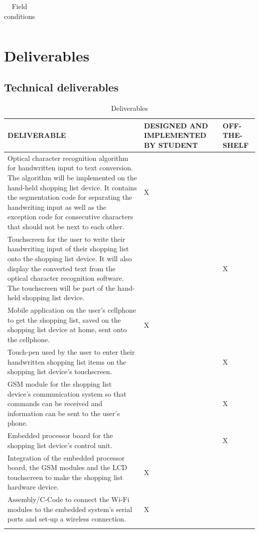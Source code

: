 {\begin{center}
\begin{longtable}{|p{7.5cm}|p{7.5cm}|}
		\caption{Field conditions}
	\end{longtable}
\end{center}
\newpage

\section{Deliverables}

\subsection{Technical deliverables}

\begin{center}
	\begin{longtable}{|p{7cm}|p{3.5cm}|p{3.5cm}|}
		\hline
		\textbf{DELIVERABLE} & \textbf{DESIGNED AND IMPLEMENTED BY STUDENT} &
		\textbf{OFF-THE-SHELF} \\
		\hline
		Optical character recognition algorithm for handwritten input to text conversion. The algorithm will be implemented on the hand-held shopping list device.  It contains the segmentation code for separating the handwriting input as well as the exception code for consecutive characters that should not be next to each other.&     X&  \\
		\hline
		Touchscreen for the user to write their handwriting input of their shopping list onto the shopping list device. It will also display the converted text from the optical character recognition software. The touchscreen will be part of the hand-held shopping list device.       &     & X \\
		\hline
		Mobile application on the user's cellphone to get the shopping list, saved on the shopping list device at home, sent onto the cellphone.         &   X  &  \\
		\hline
		Touch-pen used by the user to enter their handwritten shopping list items on the shopping list device's touchscreen. & & X\\
		\hline
		GSM module for the shopping list device's communication system so that commands can be received and information can be sent to the user's phone.& & X\\
		\hline
		Embedded processor board for the shopping list device's control unit.  & & X\\
		\hline
		Integration of the embedded processor board, the GSM modules and the LCD touchscreen to make the shopping list hardware device.  & X& \\
		\hline
		Assembly/C-Code to connect the Wi-Fi modules to the embedded system's serial ports and set-up a wireless connection.& X& \\
		\hline
		\caption{Deliverables}
	\end{longtable}
\end{center}

}
